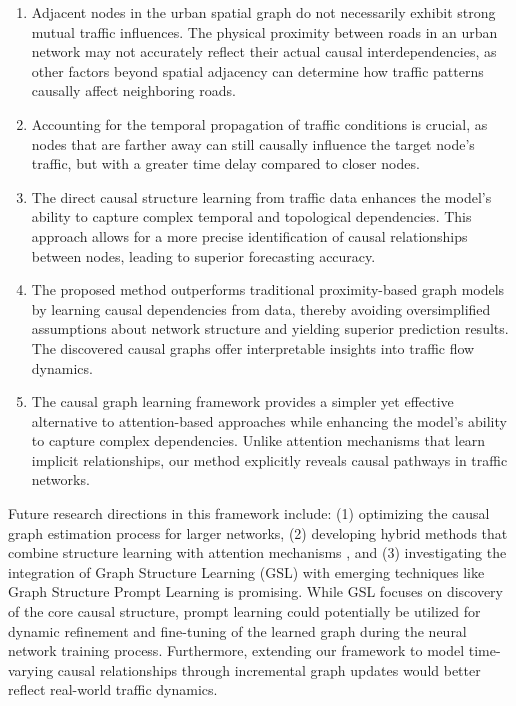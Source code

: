 \documentclass[pdflatex,sn-mathphys-num]{sn-jnl}%
\theoremstyle{thmstyleone}%
\theoremstyle{thmstyletwo}%
\theoremstyle{thmstylethree}%
\begin{document}
\begin{enumerate}
\item Adjacent nodes in the urban spatial graph do not necessarily exhibit strong mutual traffic influences. The physical proximity between roads in an urban network may not accurately reflect their actual causal interdependencies, as other factors beyond spatial adjacency can determine how traffic patterns causally affect neighboring roads.

\item Accounting for the temporal propagation of traffic conditions is crucial, as nodes that are farther away can still causally influence the target node's traffic, but with a greater time delay compared to closer nodes.

\item The direct causal structure learning from traffic data enhances the model's ability to capture complex temporal and topological dependencies. This approach allows for a more precise identification of causal relationships between nodes, leading to superior forecasting accuracy.

\item The proposed method outperforms traditional proximity-based graph models by learning causal dependencies from data, thereby avoiding oversimplified assumptions about network structure and yielding superior prediction results. The discovered causal graphs offer interpretable insights into traffic flow dynamics.

\item The causal graph learning framework provides a simpler yet effective alternative to attention-based approaches while enhancing the model's ability to capture complex dependencies. Unlike attention mechanisms that learn implicit relationships, our method explicitly reveals causal pathways in traffic networks.
\end{enumerate}

Future research directions in this framework include: (1) optimizing the causal graph estimation process for larger networks, 
(2) developing hybrid methods that combine structure learning with attention mechanisms \cite{Sun2023Attention},  and (3) investigating the integration of Graph Structure Learning (GSL) with emerging techniques like Graph Structure Prompt Learning \cite{Huang2025} is promising. While GSL focuses on discovery of the core causal structure, prompt learning could potentially be utilized for dynamic refinement and fine-tuning of the learned graph during the neural network training process. Furthermore, extending our framework to model time-varying causal relationships through incremental graph updates would better reflect real-world traffic dynamics.
\end{document}

